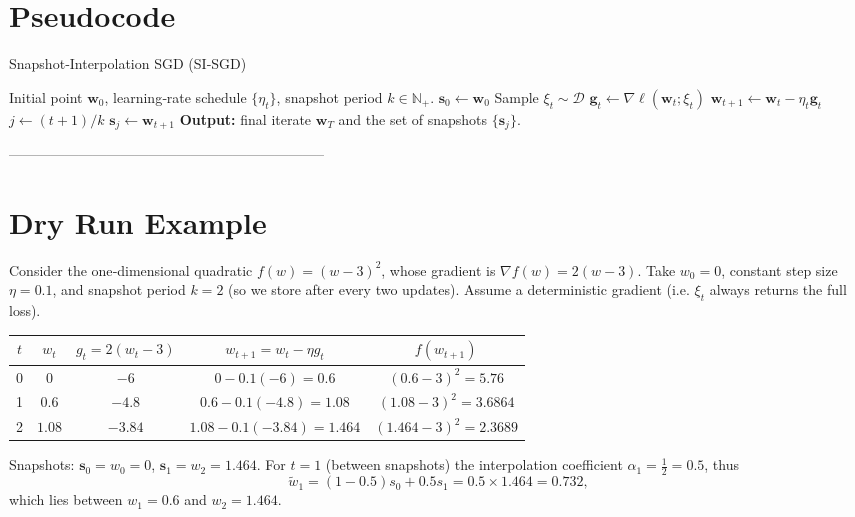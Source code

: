 \documentclass{article}
\begin{document}
\section*{Pseudocode}
\begin{algorithm}[H]
\caption{Snapshot‑Interpolation SGD (SI‑SGD)}
\begin{algorithmic}[1]
\Require Initial point $\mathbf{w}_0$, learning‑rate schedule $\{\eta_t\}$, snapshot period $k\in\mathbb{N}_+$.
\State $\mathbf{s}_0 \gets \mathbf{w}_0$ 
    \State Sample $\xi_t\sim\mathcal{D}$\;
    \State $\mathbf{g}_t \gets \nabla \ell(\mathbf{w}_t;\xi_t)$\;
    \State $\mathbf{w}_{t+1} \gets \mathbf{w}_t - \eta_t \mathbf{g}_t$ 
        \State $j \gets (t+1)/k$
        \State $\mathbf{s}_j \gets \mathbf{w}_{t+1}$ 
    \EndIf
\EndFor
\State \textbf{Output:} final iterate $\mathbf{w}_T$ and the set of snapshots $\{\mathbf{s}_j\}$.
\end{algorithmic}
\end{algorithm}

--------------------------------------------------------------------

\section*{Dry Run Example}
Consider the one‑dimensional quadratic $f(w)=(w-3)^2$, whose gradient is $\nabla f(w)=2(w-3)$.  
Take $w_0=0$, constant step size $\eta=0.1$, and snapshot period $k=2$ (so we store after every two updates).  
Assume a deterministic gradient (i.e. $\xi_t$ always returns the full loss).

\begin{center}
\begin{tabular}{c|c|c|c|c}
$t$ & $w_t$ & $g_t=2(w_t-3)$ & $w_{t+1}=w_t-\eta g_t$ & $f(w_{t+1})$\\ \hline
0 & $0$ & $-6$ & $0-0.1(-6)=0.6$ & $(0.6-3)^2=5.76$\\
1 & $0.6$ & $-4.8$ & $0.6-0.1(-4.8)=1.08$ & $(1.08-3)^2=3.6864$\\
2 & $1.08$ & $-3.84$ & $1.08-0.1(-3.84)=1.464$ & $(1.464-3)^2=2.3689$\\
\end{tabular}
\end{center}

Snapshots: $\mathbf{s}_0=w_0=0$, $\mathbf{s}_1=w_2=1.464$.  
For $t=1$ (between snapshots) the interpolation coefficient $\alpha_1=\frac{1}{2}=0.5$, thus
\[
\tilde w_1 = (1-0.5)s_0 + 0.5 s_1 = 0.5\times1.464 =0.732,
\]
which lies between $w_1=0.6$ and $w_2=1.464$.
\end{document}
